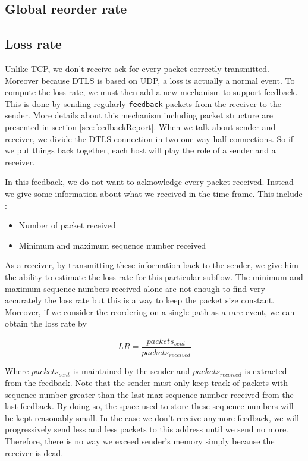 \documentclass[11pt,a4paper,oldfontcommands]{memoir}
\begin{document}
\subsection{Global reorder rate}


\subsection{Loss rate}

Unlike TCP, we don't receive ack for every packet correctly transmitted. Moreover because DTLS is based on UDP, a loss is actually a normal event. To compute the loss rate, we must then add a new mechanism to support feedback. This is done by sending regularly \verb!feedback! packets from the receiver to the sender. More details about this mechanism including packet structure are presented in section \ref{sec:feedbackReport}. When we talk about sender and receiver, we divide the DTLS connection in two one-way half-connections. So if we put things back together, each host will play the role of a sender and a receiver.

In this feedback, we do not want to acknowledge every packet received. Instead we give some information about what we received in the time frame. This include : 

\begin{itemize}
\item Number of packet received
\item Minimum and maximum sequence number received
\end{itemize}

As a receiver, by transmitting these information back to the sender, we give him the ability to estimate the loss rate for this particular subflow. The minimum and maximum sequence numbers received alone are not enough to find very accurately the loss rate but this is a way to keep the packet size constant. Moreover, if we consider the reordering on a single path as a rare event, we can obtain the loss rate by 

\begin{equation*}
LR = \frac{packets_{sent}}{packets_{received}}
\end{equation*}

Where $packets_{sent}$ is maintained by the sender and $packets_{received}$ is extracted from the feedback. Note that the sender must only keep track of packets with sequence number greater than the last max sequence number received from the last feedback. By doing so, the space used to store these sequence numbers will be kept reasonably small. In the case we don't receive anymore feedback, we will progressively send less and less packets to this address until we send no more. Therefore, there is no way we exceed sender's memory simply because the receiver is dead.
\end{document}
